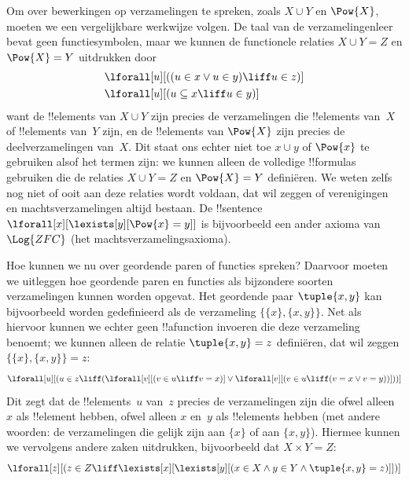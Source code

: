 \documentclass[openany]{memoir}
\begin{document}
Om over bewerkingen op verzamelingen te spreken, zoals $X \cup Y$ en
$\Pow{X}$, moeten we een vergelijkbare werkwijze volgen. De taal van de
verzamelingenleer bevat geen functiesymbolen, maar we kunnen de
functionele relaties $X \cup Y = Z$ en $\Pow{X} = Y$ uitdrukken door
\begin{align*}
& \lforall[u][((u \in x \lor u \in y) \liff u \in z)]\\
& \lforall[u][(u \subseteq x \liff u \in y )]
\end{align*}
want de !!{element}s van $X \cup Y$ zijn precies de verzamelingen die
!!{element}s van~$X$ of !!{element}s van~$Y$ zijn, en de !!{element}s
van $\Pow{X}$ zijn precies de deelverzamelingen van~$X$. Dit staat ons
echter niet toe $x \cup y$ of $\Pow{x}$ te gebruiken alsof het termen
zijn: we kunnen alleen de volledige !!{formula}s gebruiken die de
relaties $X \cup Y = Z$ en $\Pow{X} = Y$ definiëren. We weten zelfs nog
niet of ooit aan deze relaties wordt voldaan, dat wil zeggen of
verenigingen en machtsverzamelingen altijd bestaan. De !!{sentence}
$\lforall[x][\lexists[y][\Pow{x} = y]]$ is bijvoorbeeld een ander
axioma van~$\Log{ZFC}$ (het machtsverzamelingsaxioma).

Hoe kunnen we nu over geordende paren of functies spreken? Daarvoor
moeten we uitleggen hoe geordende paren en functies als bijzondere
soorten verzamelingen kunnen worden opgevat. Het geordende paar
$\tuple{x, y}$ kan bijvoorbeeld worden gedefinieerd als de verzameling
$\{\{x\}, \{x, y\}\}$. Net als hiervoor kunnen we echter geen
!!a{function} invoeren die deze verzameling benoemt; we kunnen alleen
de relatie $\tuple{x, y} = z$ definiëren, dat wil zeggen
$\{\{x\}, \{x, y\}\} = z$:
\[
\lforall[u][(u \in z \liff (\lforall[v][(v \in u \liff v = x)] \lor
  \lforall[v][(v \in u \liff (v = x \lor v = y))]))]
\]
Dit zegt dat de !!{element}s~$u$ van~$z$ precies de verzamelingen zijn
die ofwel alleen $x$ als !!{element} hebben, ofwel alleen $x$ en~$y$ als
!!{element}s hebben (met andere woorden: de verzamelingen die gelijk
zijn aan $\{x\}$ of aan $\{x, y\}$). Hiermee kunnen we vervolgens
andere zaken uitdrukken, bijvoorbeeld dat $X \times Y = Z$:
\[
\lforall[z][(z \in Z \liff \lexists[x][\lexists[y][(x \in
        X \land y \in Y \land \tuple{x, y} = z)]])]
\]
\end{document}

